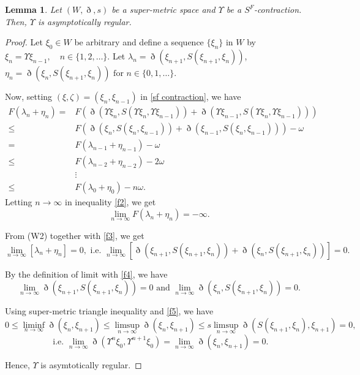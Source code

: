 \documentclass[pdflatex,sn-mathphys-num]{sn-jnl}%
\theoremstyle{thmstyleone}%
\newtheorem{lemma}[theorem]{Lemma}
\theoremstyle{thmstyletwo}%
\theoremstyle{thmstylethree}%
\begin{document}
\begin{lemma}\label{asym lemma}
    Let $(W,\eth,s)$ be a super-metric space and $\Upsilon $ be a \textit{$S^F$-contraction}. Then, $\Upsilon $ is asymptotically regular.
\end{lemma}
\begin{proof}
        Let $\xi_0 \in W$ be arbitrary and define a sequence $\{\xi_n\}$ in $W$ by $\xi_n = \Upsilon \xi _{n-1}, \quad n \in \{1,2,\ldots\}$. Let $\lambda_n = \eth(\xi_{n+1}, S(\xi_{n+1}, \xi_n))$, $ \eta_n = \eth(\xi_{n}, S(\xi_{n+1}, \xi_n)) \text{ for } n \in \{0,1,\ldots\}$.

Now, setting $(\xi ,\zeta)=(\xi_n,\xi_{n-1})$ in \eqref{sf contraction}, we have
\begin{equation}\label{f2}
\begin{split}
    F(\lambda_n+\eta_n)=&F(\eth(\Upsilon \xi_{n},S(\Upsilon \xi_{n},\Upsilon \xi _{n-1}))+\eth(\Upsilon \xi_{n-1},S(\Upsilon \xi_{n},\Upsilon \xi _{n-1})))\\
    \le& F(\eth(\xi_{n},S(\xi_{n},\xi_{n-1}))+\eth(\xi_{n-1},S(\xi_{n},\xi_{n-1})))-\omega  \\
    =& F(\lambda_{n-1}+\eta_{n-1})-\omega  \\
    \le& F(\lambda_{n-2}+\eta_{n-2})-2\omega  \\
    &\vdots\\
    \le& F(\lambda_{0}+\eta_{0})-n\omega  .
    \end{split}
\end{equation}
Letting $n \to \infty$ in inequality \eqref{f2}, we get
\begin{equation}\label{f3}
    \lim_{n\to \infty}F(\lambda_n+\eta_n)=-\infty.
\end{equation}

From (W2) together with \eqref{f3}, we get
\begin{equation}\label{f4}
    \lim_{n \to \infty} \left[\lambda_n+\eta_n \right] =0, \text{ i.e. } \lim_{n \to \infty}\left[\eth(\xi_{n+1}, S(\xi_{n+1}, \xi_n)) + \eth(\xi_{n}, S(\xi_{n+1}, \xi_n))\right] =0.
\end{equation}


    By the definition of limit with \eqref{f4}, we have
    \begin{equation}\label{f5}
        \lim_{n \to \infty}\eth(\xi_{n+1}, S(\xi_{n+1}, \xi_n))=0 \text{ and }  \lim_{n \to \infty}\eth(\xi_{n}, S(\xi_{n+1}, \xi_n))=0.
    \end{equation}
    
  Using super-metric triangle inequality and \eqref{f5}, we have
  $$0 \le \liminf_{n \to \infty}\eth(\xi_n,\xi_{n+1})\le \limsup_{n \to \infty}\eth(\xi_n,\xi_{n+1}) \le s\limsup_{n \to \infty}\eth(S(\xi_{n+1},\xi_n),\xi_{n+1})=0,$$
  \begin{equation}\label{f6}
      \text{ i.e. } \lim_{n \to \infty}\eth(\Upsilon^n\xi_0,\Upsilon^{n+1}\xi_0)=\lim_{n \to \infty}\eth(\xi_n,\xi_{n+1})=0.
  \end{equation}

  Hence, $\Upsilon $ is asymtotically regular.
\end{proof}
\end{document}

